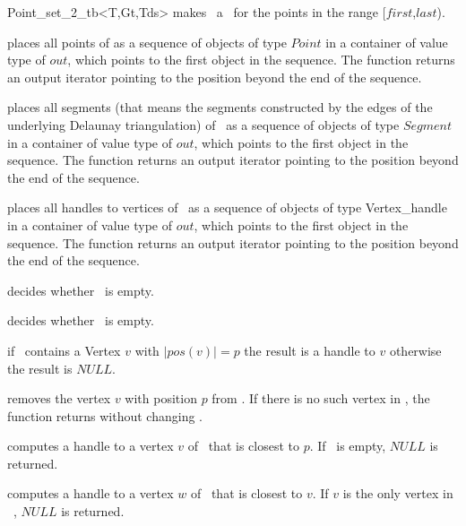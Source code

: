 \begin{ccRefClass}{Point_set_2_tb<T,Gt,Tds>}
{ makes \ccVar\ a \ccRefName\ for the points in the range
[$first$,$last$).}

{ places all points of \ccVar as a sequence of objects of type
$Point$ in a container of value type of  $out$,
which points to the first object in the sequence. The function
returns an output iterator pointing to the position beyond the end
of the sequence.} 

{ places all segments (that means the segments constructed by the edges of the underlying
Delaunay triangulation)
of \ccVar\ as a sequence of objects of type
$Segment$ in a container of value type of $out$,
which points to the first object in the sequence. The function
returns an output iterator pointing to the position beyond the end
of the sequence.} 

\ccHtmlLinksOff

{ places all handles to vertices of \ccVar\ as a sequence of objects of type
Vertex\_handle in a container of value type of $out$,
which points to the first object in the sequence. The function
returns an output iterator pointing to the position beyond the end
of the sequence.} 

\ccHtmlLinksOn

{ decides whether \ccVar\ is empty. }

{ decides whether \ccVar\ is empty. }


\ccHtmlLinksOff

{ if \ccVar\ contains a Vertex $v$ with $|pos(v)| = p$ 
the result is a handle to $v$ otherwise the result is $NULL$. }

{ removes the vertex $v$ with position $p$ from \ccVar. If there is
no such vertex in \ccVar, the function returns without changing \ccVar. }

{ computes a handle to a vertex $v$ of \ccVar\ that is closest to $p$.
If \ccVar\ is empty, $NULL$ is returned.
}

{ computes a handle to a vertex $w$ of \ccVar\ that is closest to $v$.
If $v$ is the only vertex in \ccVar\ , $NULL$ is returned.
}


\end{ccRefClass}
